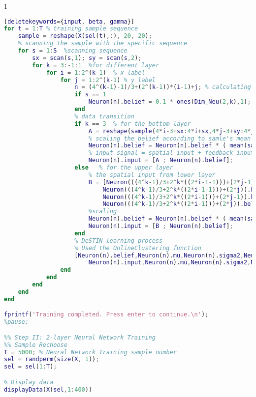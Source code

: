 \begin{spacing}{1}
\begin{lstlisting}[language=Matlab][deletekeywords={input, beta, gamma}]
for t = 1:T % training sample sequence
    sample = reshape(X(sel(t),:), 20, 20);
    % scanning the sample with the specific sequence
    for s = 1:S  %scanning sequence
        sx = scan(s,1); sy = scan(s,2);
        for k = 3:-1:1  %for different layer
            for i = 1:2^(k-1)  % x label
                for j = 1:2^(k-1) % y label
                    n = (4^(k-1)-1)/3+(2^(k-1))*(i-1)+j; % calculating the neuron order number
                    if s == 1
                        Neuron(n).belief = 0.1 * ones(Dim_Neu(2,k),1); % reset the belief state at the beginning of each scanning; the belief state will be re-scaled later
                    end
                    % data transition
                    if k == 3  % for the bottom layer
                        A = reshape(sample(4*i-3+sx:4*i+sx,4*j-3+sy:4*j+sy),16,1);
                        % scaling the belief according to samle's mean value
                        Neuron(n).belief = Neuron(n).belief * ( mean(sample(:))./mean(Neuron(n).belief(:)) );
                        % input signal = spatial input + feedback input
                        Neuron(n).input = [A ; Neuron(n).belief];
                    else   % for the upper layer
                        % the spatial input from lower layer
                        B = [Neuron(((4^k-1)/3+2^k*((2*i-1-1)))+(2*j-1)).belief;...
                            Neuron(((4^k-1)/3+2^k*((2*i-1-1)))+(2*j)).belief;...
                            Neuron(((4^k-1)/3+2^k*((2*i-1)))+(2*j-1)).belief;...
                            Neuron(((4^k-1)/3+2^k*((2*i-1)))+(2*j)).belief];
                        %scaling
                        Neuron(n).belief = Neuron(n).belief * ( mean(sample(:))./mean(Neuron(n).belief(:)) );
                        Neuron(n).input = [B ; Neuron(n).belief];
                    end
                    % DeSTIN learning process
                    % Used the OnlineClustering function
                    [Neuron(n).belief,Neuron(n).mu,Neuron(n).sigma2,Neuron(n).starve] = OnlineClustering(...
                        Neuron(n).input,Neuron(n).mu,Neuron(n).sigma2,Neuron(n).starve, alpha,beta,gamma,training);
                end
            end
        end
    end
end

fprintf('Training completed. Press enter to continue.\n');
%pause;

%% Step II: 2-layer Neural Network Training
%% Sample Rechoose
T = 5000; % Neural Network Training sample number
sel = randperm(size(X, 1));
sel = sel(1:T);

% Display data
displayData(X(sel,1:400))


\end{lstlisting}
\end{spacing}
